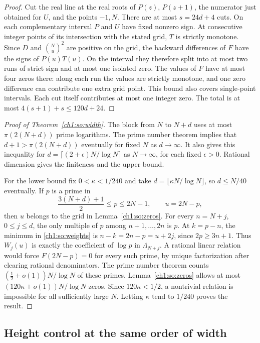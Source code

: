 \documentclass[11pt,a4paper,oneside,openany]{report}
\theoremstyle{remark}\newtheorem{remark}[theorem]{Remark}
\numberwithin{equation}{section}
\begin{document}
\begin{proof}
Cut the real line at the real roots of $P(z)$, $P(z+1)$, the
numerator just obtained for $U$, and the points $-1,N$. There are
at most $s=24d+4$ cuts. On each complementary interval $P$ and $U$
have fixed nonzero sign. At consecutive integer points of its
intersection with the stated grid, $T$ is strictly monotone. Since
$D$ and $\binom Nu^2$ are positive on the grid, the backward
differences of $F$ have the signs of $P(u)T(u)$. On the interval they
therefore split into at most two runs of strict sign and at most one
isolated zero. The values of $F$ have at most four zeros there:
along each run the values are strictly monotone, and one zero
difference can contribute one extra grid point. This bound also
covers single-point intervals. Each cut itself contributes at most
one integer zero. The total is at most $4(s+1)+s\le120d+24$.
\end{proof}

\begin{proof}[Proof of Theorem~\ref{ch1:so:width}]
The block from $N$ to $N+d$ uses at most $\pi(2(N+d))$ prime logarithms.
The prime number theorem implies that $d+1>\pi(2(N+d))$ eventually
for fixed $N$ as $d\to\infty$. It also gives this inequality for
$d=\lceil(2+\epsilon)N/\log N\rceil$ as $N\to\infty$, for each
fixed $\epsilon>0$. Rational dimension gives the finiteness and the
upper bound.

For the lower bound fix $0<\kappa<1/240$ and take
$d=\lfloor\kappa N/\log N\rfloor$, so $d\le N/40$ eventually.
If $p$ is a prime in
\[
 \frac{3(N+d)+1}{2}\le p\le 2N-1,\qquad u=2N-p,
\]
then $u$ belongs to the grid in Lemma~\ref{ch1:so:zeros}. For every
$n=N+j$, $0\le j\le d$, the only multiple of $p$ among
$n+1,\ldots,2n$ is $p$. At $k=p-n$, the minimum in
\eqref{ch1:so:weights} is $n-k=2n-p=u+2j$, since $2p\ge3n+1$.
Thus $W_j(u)$ is exactly the coefficient of $\log p$ in $\Lambda_{N+j}$.
A rational linear relation would force $F(2N-p)=0$ for every such
prime, by unique factorization after clearing rational denominators.
The prime number theorem counts $(\tfrac12+o(1))N/\log N$ of these
primes. Lemma~\ref{ch1:so:zeros} allows at most
$(120\kappa+o(1))N/\log N$ zeros. Since $120\kappa<1/2$, a
nontrivial relation is impossible for all sufficiently large $N$.
Letting $\kappa$ tend to $1/240$ proves the result.
\end{proof}

\subsection{Height control at the same order of width}
\end{document}
